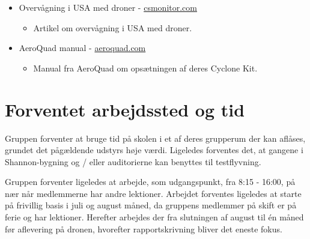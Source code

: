 \documentclass[Main]{subfiles}
\begin{document}
\begin{itemize}
	\item Overvågning i USA med droner - \href{http://www.csmonitor.com/USA/Society/2013/0313/Drones-over-America-public-safety-benefit-or-creepy-privacy-threat}{csmonitor.com}
	
		\begin{itemize}
		\item Artikel om overvågning i USA med droner.
		\end{itemize}
			
	
	\item AeroQuad manual - \href{http://aeroquad.com/showwiki.php?title=Book:AeroQuad+Manual}{aeroquad.com}
	
		\begin{itemize}
		\item Manual fra AeroQuad om opsætningen af deres Cyclone Kit.
		\end{itemize}
	

	\end{itemize}



\section{Forventet arbejdssted og tid}

Gruppen forventer at bruge tid på skolen i et af deres grupperum der kan aflåses, grundet det pågældende udstyrs høje værdi.
Ligeledes forventes det, at gangene i Shannon-bygning og / eller auditorierne kan benyttes til testflyvning.

Gruppen forventer ligeledes at arbejde, som udgangspunkt, fra 8:15 - 16:00, på nær når medlemmerne har andre lektioner.
Arbejdet forventes ligeledes at starte på frivillig basis i juli og august måned, da gruppens medlemmer på skift er på ferie og har lektioner.
Herefter arbejdes der fra slutningen af august til én måned før aflevering på dronen, hvorefter rapportskrivning bliver det eneste fokus.
\end{document}
